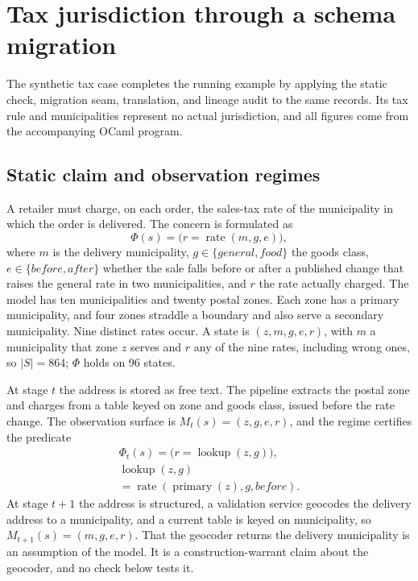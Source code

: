 \documentclass[twocolumn,envcountsect,envcountsame,natbib]{svjour3}
\begin{document}
\section{Tax jurisdiction through a schema migration}\label{ex:sec:case}

The synthetic tax case completes the running example by applying the static check, migration seam, translation, and lineage audit to the same records. Its tax rule and municipalities represent no actual jurisdiction, and all figures come from the accompanying OCaml program.

\subsection{Static claim and observation regimes}

A retailer must charge, on each order, the sales-tax rate of the municipality in which the order is delivered. The concern is formulated as
\[
\Phi(s)=\bigl(r=\operatorname{rate}(m,g,e)\bigr),
\]
where $m$ is the delivery municipality, $g \in \{\mathit{general},\mathit{food}\}$ the goods class, $e \in \{\mathit{before},\mathit{after}\}$ whether the sale falls before or after a published change that raises the general rate in two municipalities, and $r$ the rate actually charged. The model has ten municipalities and twenty postal zones. Each zone has a primary municipality, and four zones straddle a boundary and also serve a secondary municipality. Nine distinct rates occur. A state is $(z,m,g,e,r)$, with $m$ a municipality that zone $z$ serves and $r$ any of the nine rates, including wrong ones, so $|S|=864$; $\Phi$ holds on 96 states.

At stage $t$ the address is stored as free text. The pipeline extracts the postal zone and charges from a table keyed on zone and goods class, issued before the rate change. The observation surface is $M_t(s)=(z,g,e,r)$, and the regime certifies the predicate
\[
\begin{gathered}
\Phi_t(s)=\bigl(r=\operatorname{lookup}(z,g)\bigr),\\
\operatorname{lookup}(z,g)\\
{}=\operatorname{rate}(\operatorname{primary}(z),g,\mathit{before}).
\end{gathered}
\]
At stage $t+1$ the address is structured, a validation service geocodes the delivery address to a municipality, and a current table is keyed on municipality, so $M_{t+1}(s)=(m,g,e,r)$. That the geocoder returns the delivery municipality is an assumption of the model. It is a construction-warrant claim about the geocoder, and no check below tests it.
\end{document}
